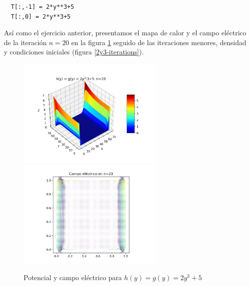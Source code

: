 \documentclass[10pt,journal,compsoc]{IEEEtran}
\begin{document}
\begin{lstlisting}
  T[:,-1] = 2*y**3+5
  T[:,0] = 2*y**3+5
\end{lstlisting}

Así como el ejercicio anterior, presentamos el mapa de calor y el campo eléctrico de la iteración \(n=20\) en la figura \ref{2y3-n20} seguido de 
las iteraciones menores, densidad y condiciones iniciales (figura \ref{2y3-iterations}).

\begin{figure}
  \centering
  \includegraphics[width=2.8in]{images/2y3-n20}
  \includegraphics[width=2.8in]{images/2y3-field}
  \caption{Potencial y campo eléctrico para \(h(y) = g(y) = 2y^3+5\)}
  \label{2y3-n20}
\end{figure}
\end{document}
